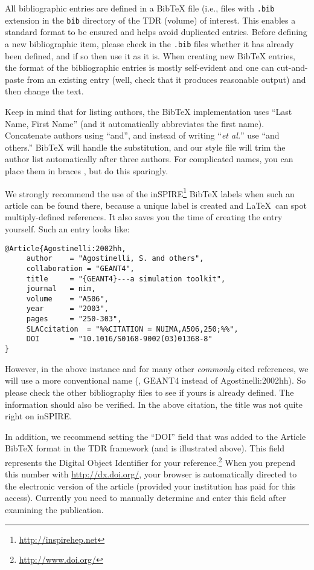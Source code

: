 All bibliographic entries are defined in a BibTeX file
(i.e., files with \texttt{.bib} extension in the \texttt{bib} directory
of the TDR (volume) of interest.
This enables a standard format to be ensured and helps avoid
duplicated entries.
Before defining a new bibliographic item, please check in the
\texttt{.bib} files whether it has already been defined, and if so
then use it as it is. When creating new BibTeX entries, the format of
the bibliographic entries is mostly self-evident and one can
cut-and-paste from an existing entry (well, check that it produces
reasonable output) and then change the text.

Keep in mind that for listing authors, the BibTeX implementation uses
``Last Name, First Name'' (and it automatically abbreviates the first
name). Concatenate authors using ``and'', and instead of writing
``\emph{et
al.}'' use ``and others.'' BibTeX will handle the substitution,
and our style file will trim the author list automatically after three authors. For
complicated names, you can place them in braces ${}$, but do this
sparingly.


We strongly recommend the use of the inSPIRE\footnote
{\url{http://inspirehep.net}} BibTeX labels when such an
article can be found there, because a unique label is created and
\LaTeX\ can spot multiply-defined references. It also saves you the time
of creating the entry yourself. Such an entry looks like:

\begin{verbatim}
@Article{Agostinelli:2002hh,
     author    = "Agostinelli, S. and others",
     collaboration = "GEANT4",
     title     = "{GEANT4}---a simulation toolkit",
     journal   = nim,
     volume    = "A506",
     year      = "2003",
     pages     = "250-303",
     SLACcitation  = "%%CITATION = NUIMA,A506,250;%%",
     DOI       = "10.1016/S0168-9002(03)01368-8"
}
\end{verbatim}

However, in the above instance and for many other \emph{commonly} cited
references, we will use a more conventional name (\eg,
GEANT4 instead of Agostinelli:2002hh). So please check the other bibliography files to see if yours
is already defined. The information should also be verified. In the above citation, the title was not quite right on inSPIRE.

In addition, we recommend setting the ``DOI'' field that was added to
the Article BibTeX format in the TDR framework (and is illustrated
above). This field represents
the Digital Object
Identifier for your reference.\footnote{\url{http://www.doi.org/}}
When you prepend this number with \url{http://dx.doi.org/}, your
browser is automatically directed to the electronic version of the
article (provided your institution has paid for this access). Currently
you need to manually determine and enter this field after examining the
publication.

